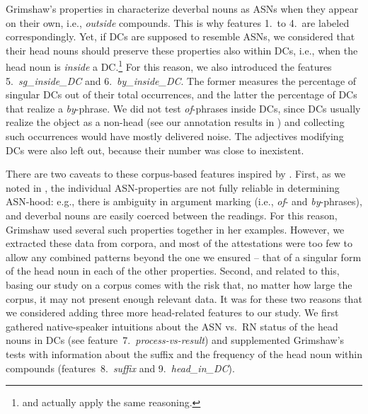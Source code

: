 \documentclass[output=paper]{langsci/langscibook}
\begin{document}
Grimshaw's properties in  characterize deverbal nouns as ASNs when they appear on their own, i.e., \textit{outside} compounds. This is why features 1.~to 4.~are labeled correspondingly. Yet, if DCs are supposed to resemble ASNs, we considered that their head nouns should preserve these properties also within DCs, i.e., when the head noun is \textit{inside} a DC.\footnote{\cite{disciullo:92} and \cite{borer:13} actually apply the same reasoning.} For this reason, we also introduced the features 5.~\textit{sg\_inside\_DC} and 6.~\textit{by\_inside\_DC}. The former measures the percentage of singular DCs out of their total occurrences, and the latter the percentage of DCs that realize a \textit{by}-phrase. We did not test \textit{of}-phrases inside DCs, since DCs usually realize the object as a non-head (see our annotation results in ) and collecting such occurrences would have mostly delivered noise. The adjectives modifying DCs were also left out, because their number was close to inexistent.

There are two caveats to these corpus-based features inspired by \cite{grimshaw:90}. First, as we noted in , the individual ASN-properties are not fully reliable in determining ASN-hood: e.g., there is ambiguity in argument marking (i.e., \textit{of}- and \textit{by}-phrases), and  deverbal nouns are easily coerced between the readings. For this reason, Grimshaw used several such properties together in her examples. However, we extracted these data from corpora, and most of the attestations were too few to allow any combined patterns beyond the one we ensured -- that of a singular form of the head noun in each of the other properties. Second, and related to this, basing our study on a corpus comes with the risk that, no matter how large the corpus, it may not present enough relevant data. It was for these two reasons that we considered adding three more head-related features to our study. We first gathered native-speaker intuitions about the ASN vs.~RN status of the head nouns in DCs (see  feature~7.~\textit{process-vs-result}) and supplemented Grimshaw's tests with information about the suffix  and the frequency of  the head noun within compounds (features~8.~\textit{suffix} and 9.~\textit{head\_in\_DC}).
\end{document}
